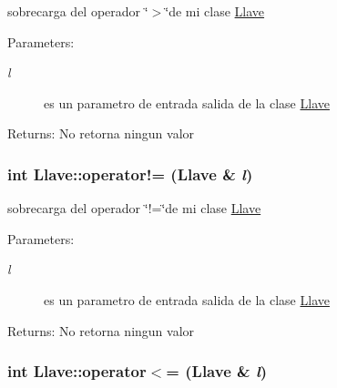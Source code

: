 sobrecarga del operador \char`\"{}$>$\char`\"{}de mi clase \hyperlink{classLlave}{Llave} \begin{Desc}
\item[Parameters:]
\begin{description}
\item[{\em l}]es un parametro de entrada salida de la clase \hyperlink{classLlave}{Llave} \end{description}
\end{Desc}
\begin{Desc}
\item[Returns:]No retorna ningun valor \end{Desc}
\hypertarget{classLlave_da6d6ec0cb9dc0c04b2b39d4a0dd9128}{
\subsubsection[operator"!=]{\setlength{\rightskip}{0pt plus 5cm}int Llave::operator!= ({\bf Llave} \& {\em l})}}
\label{classLlave_da6d6ec0cb9dc0c04b2b39d4a0dd9128}


sobrecarga del operador \char`\"{}!=\char`\"{}de mi clase \hyperlink{classLlave}{Llave} \begin{Desc}
\item[Parameters:]
\begin{description}
\item[{\em l}]es un parametro de entrada salida de la clase \hyperlink{classLlave}{Llave} \end{description}
\end{Desc}
\begin{Desc}
\item[Returns:]No retorna ningun valor \end{Desc}
\hypertarget{classLlave_82d40399d2418c8e117f62f7df6ee95c}{
\subsubsection[operator$<$=]{\setlength{\rightskip}{0pt plus 5cm}int Llave::operator$<$= ({\bf Llave} \& {\em l})}}
\label{classLlave_82d40399d2418c8e117f62f7df6ee95c}


